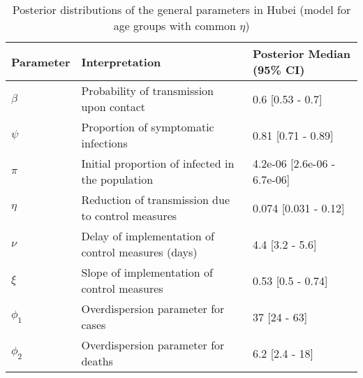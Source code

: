 \begin{table}[ht]
\centering
\begin{tabular}{lp{9cm}p{3cm}}
  \hline
Parameter & Interpretation & Posterior Median (95\% CI) \\ 
  \hline
$\beta$ & Probability of transmission upon contact & 0.6 [0.53 - 0.7] \\ 
  $\psi$ & Proportion of symptomatic infections & 0.81 [0.71 - 0.89] \\ 
  $\pi$ & Initial proportion of infected in the population & 4.2e-06 [2.6e-06 - 6.7e-06] \\ 
  $\eta$ & Reduction of transmission due to control measures & 0.074 [0.031 - 0.12] \\ 
  $\nu$ & Delay of implementation of control measures (days) & 4.4 [3.2 - 5.6] \\ 
  $\xi$ & Slope of implementation of control measures & 0.53 [0.5 - 0.74] \\ 
  $\phi_1$ & Overdispersion parameter for cases & 37 [24 - 63] \\ 
  $\phi_2$ & Overdispersion parameter for deaths & 6.2 [2.4 - 18] \\ 
   \hline
\end{tabular}
\caption{Posterior distributions of the general parameters in Hubei (model for age groups with common $\eta$)} 
\label{tab:ParamTableHubei_Age_CommonEta}
\end{table}
